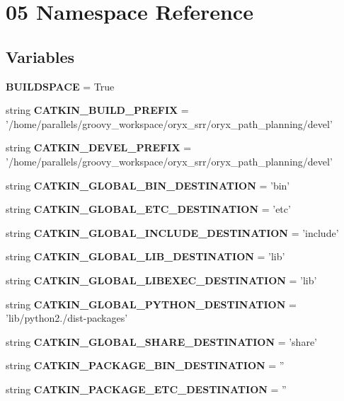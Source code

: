 \section{05 \-Namespace \-Reference}
\label{namespace05}
\subsection*{\-Variables}
\begin{DoxyCompactItemize}
\item 
{\bf \-B\-U\-I\-L\-D\-S\-P\-A\-C\-E} = \-True
\item 
string {\bf \-C\-A\-T\-K\-I\-N\-\_\-\-B\-U\-I\-L\-D\-\_\-\-P\-R\-E\-F\-I\-X} = '/home/parallels/groovy\-\_\-workspace/oryx\-\_\-srr/oryx\-\_\-path\-\_\-planning/devel'
\item 
string {\bf \-C\-A\-T\-K\-I\-N\-\_\-\-D\-E\-V\-E\-L\-\_\-\-P\-R\-E\-F\-I\-X} = '/home/parallels/groovy\-\_\-workspace/oryx\-\_\-srr/oryx\-\_\-path\-\_\-planning/devel'
\item 
string {\bf \-C\-A\-T\-K\-I\-N\-\_\-\-G\-L\-O\-B\-A\-L\-\_\-\-B\-I\-N\-\_\-\-D\-E\-S\-T\-I\-N\-A\-T\-I\-O\-N} = 'bin'
\item 
string {\bf \-C\-A\-T\-K\-I\-N\-\_\-\-G\-L\-O\-B\-A\-L\-\_\-\-E\-T\-C\-\_\-\-D\-E\-S\-T\-I\-N\-A\-T\-I\-O\-N} = 'etc'
\item 
string {\bf \-C\-A\-T\-K\-I\-N\-\_\-\-G\-L\-O\-B\-A\-L\-\_\-\-I\-N\-C\-L\-U\-D\-E\-\_\-\-D\-E\-S\-T\-I\-N\-A\-T\-I\-O\-N} = 'include'
\item 
string {\bf \-C\-A\-T\-K\-I\-N\-\_\-\-G\-L\-O\-B\-A\-L\-\_\-\-L\-I\-B\-\_\-\-D\-E\-S\-T\-I\-N\-A\-T\-I\-O\-N} = 'lib'
\item 
string {\bf \-C\-A\-T\-K\-I\-N\-\_\-\-G\-L\-O\-B\-A\-L\-\_\-\-L\-I\-B\-E\-X\-E\-C\-\_\-\-D\-E\-S\-T\-I\-N\-A\-T\-I\-O\-N} = 'lib'
\item 
string {\bf \-C\-A\-T\-K\-I\-N\-\_\-\-G\-L\-O\-B\-A\-L\-\_\-\-P\-Y\-T\-H\-O\-N\-\_\-\-D\-E\-S\-T\-I\-N\-A\-T\-I\-O\-N} = 'lib/python2./dist-\/packages'
\item 
string {\bf \-C\-A\-T\-K\-I\-N\-\_\-\-G\-L\-O\-B\-A\-L\-\_\-\-S\-H\-A\-R\-E\-\_\-\-D\-E\-S\-T\-I\-N\-A\-T\-I\-O\-N} = 'share'
\item 
string {\bf \-C\-A\-T\-K\-I\-N\-\_\-\-P\-A\-C\-K\-A\-G\-E\-\_\-\-B\-I\-N\-\_\-\-D\-E\-S\-T\-I\-N\-A\-T\-I\-O\-N} = ''
\item 
string {\bf \-C\-A\-T\-K\-I\-N\-\_\-\-P\-A\-C\-K\-A\-G\-E\-\_\-\-E\-T\-C\-\_\-\-D\-E\-S\-T\-I\-N\-A\-T\-I\-O\-N} = ''
\item 

\end{DoxyCompactItemize}
